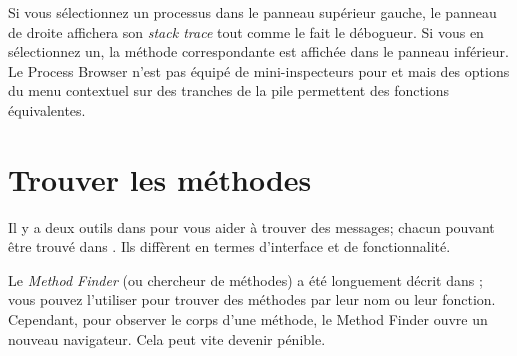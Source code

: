 \documentclass[a4paper,10pt,twoside]{book}
\begin{document}
Si vous s\'electionnez un processus dans le panneau sup\'erieur gauche, le panneau de droite
affichera son \emph{stack trace} tout comme le fait le d\'ebogueur.
Si vous en s\'electionnez un, la m\'ethode correspondante est affich\'ee dans le panneau
inf\'erieur.
Le Process Browser n'est pas \'equip\'e de mini-inspecteurs pour 
\self et  mais des options du menu contextuel sur des 
tranches de la pile permettent des fonctions \'equivalentes.



\section{Trouver les m\'ethodes}
\label{sec:methodFinder} 

Il y a deux outils dans \pharo pour vous aider \`a trouver des messages; 
chacun pouvant \^etre trouv\'e dans \toolsflapind.
Ils diff\`erent en termes d'interface et de fonctionnalit\'e.

Le \emph{Method Finder} (ou chercheur de m\'ethodes) a \'et\'e longuement d\'ecrit
dans ; vous pouvez l'utiliser pour trouver des m\'ethodes
par leur nom ou leur fonction.
Cependant, pour observer le corps d'une m\'ethode, le Method Finder ouvre 
un nouveau navigateur. Cela peut vite devenir p\'enible.
\end{document}
